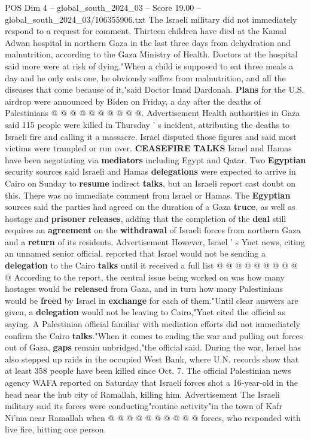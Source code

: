\begin{textsample}{POS Dim 4 – global\_south\_2024\_03 – Score 19.00 – global\_south\_2024\_03/106355906.txt}
The Israeli military did not immediately respond to a request for comment.
Thirteen children have died at the Kamal Adwan hospital in northern Gaza in the last three days from dehydration and malnutrition, according to the Gaza Ministry of Health.
Doctors at the hospital said more were at risk of dying."When a child is supposed to eat three meals a day and he only eats one, he obviously suffers from malnutrition, and all the diseases that come because of it,"said Doctor Imad Dardonah. \textbf{Plans} for the U.S. airdrop were announced by Biden on Friday, a day after the deaths of Palestinians @ @ @ @ @ @ @ @ @ @.
Advertisement Health authorities in Gaza said 115 people were killed in Thursday ' s incident, attributing the deaths to Israeli fire and calling it a massacre.
Israel disputed those figures and said most victims were trampled or run over. \textbf{CEASEFIRE} \textbf{TALKS} Israel and Hamas have been negotiating via \textbf{mediators} including Egypt and Qatar.
Two \textbf{Egyptian} security sources said Israeli and Hamas \textbf{delegations} were expected to arrive in Cairo on Sunday to \textbf{resume} indirect \textbf{talks}, but an Israeli report cast doubt on this.
There was no immediate comment from Israel or Hamas.
The \textbf{Egyptian} sources said the parties had agreed on the duration of a Gaza \textbf{truce}, as well as hostage and \textbf{prisoner} \textbf{releases}, adding that the completion of the \textbf{deal} still requires an \textbf{agreement} on the \textbf{withdrawal} of Israeli forces from northern Gaza and a \textbf{return} of its residents.
Advertisement However, Israel ' s Ynet news, citing an unnamed senior official, reported that Israel would not be sending a \textbf{delegation} to the Cairo \textbf{talks} until it received a full list @ @ @ @ @ @ @ @ @ @ According to the report, the central issue being worked on was how many hostages would be \textbf{released} from Gaza, and in turn how many Palestinians would be \textbf{freed} by Israel in \textbf{exchange} for each of them."Until clear answers are given, a \textbf{delegation} would not be leaving to Cairo,"Ynet cited the official as saying.
A Palestinian official familiar with mediation efforts did not immediately confirm the Cairo \textbf{talks}."When it comes to ending the war and pulling out forces out of Gaza, \textbf{gaps} remain unbridged,"the official said.
During the war, Israel has also stepped up raids in the occupied West Bank, where U.N. records show that at least 358 people have been killed since Oct. 7.
The official Palestinian news agency WAFA reported on Saturday that Israeli forces shot a 16-year-old in the head near the hub city of Ramallah, killing him.
Advertisement The Israeli military said its forces were conducting"routine activity"in the town of Kafr Ni'ma near Ramallah when @ @ @ @ @ @ @ @ @ @ forces, who responded with live fire, hitting one person.

\end{textsample}

